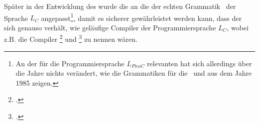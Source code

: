 Später in der Entwicklung des  wurde die  an die  der echten Grammatik~\cite{noauthor_ansi_nodate} der Sprache $L_C$ angepasst\footnote{An der für die Programmiersprache $L_{PicoC}$ relevanten  hat sich allerdings über die Jahre nichts verändert, wie die Grammatiken für die  \cite{noauthor_ansi_nodate-1}\ und  \cite{noauthor_ansi_nodate-2} aus dem Jahre 1985 zeigen.}, damit es sicherer gewährleistet werden kann, dass der  sich genauso verhält, wie geläufige Compiler der Programmiersprache $L_C$, wobei z.B. die Compiler \footcite{noauthor_gcc_nodate} und \footcite{noauthor_clang_nodate} zu nennen wären.

